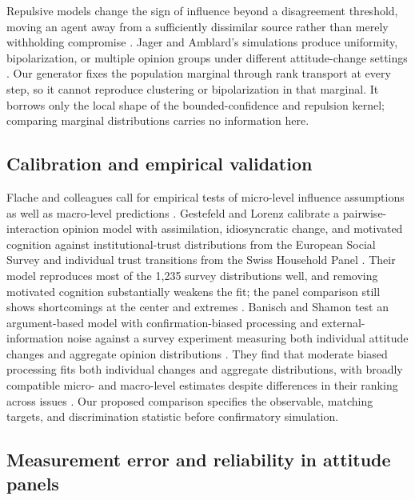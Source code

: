 Repulsive models change the sign of influence beyond a disagreement threshold, moving an agent away from a sufficiently dissimilar source rather than merely withholding compromise \cite{jager2005,flache2017}.
Jager and Amblard's simulations produce uniformity, bipolarization, or multiple opinion groups under different attitude-change settings \cite{jager2005}.
Our generator fixes the population marginal through rank transport at every step, so it cannot reproduce clustering or bipolarization in that marginal. It borrows only the local shape of the bounded-confidence and repulsion kernel; comparing marginal distributions carries no information here.

\subsection{Calibration and empirical validation}

Flache and colleagues call for empirical tests of micro-level influence assumptions as well as macro-level predictions \cite{flache2017}.
Gestefeld and Lorenz calibrate a pairwise-interaction opinion model with assimilation, idiosyncratic change, and motivated cognition against institutional-trust distributions from the European Social Survey and individual trust transitions from the Swiss Household Panel \cite{gestefeld2023}.
Their model reproduces most of the 1,235 survey distributions well, and removing motivated cognition substantially weakens the fit; the panel comparison still shows shortcomings at the center and extremes \cite{gestefeld2023}.
Banisch and Shamon test an argument-based model with confirmation-biased processing and external-information noise against a survey experiment measuring both individual attitude changes and aggregate opinion distributions \cite{banisch2024}.
They find that moderate biased processing fits both individual changes and aggregate distributions, with broadly compatible micro- and macro-level estimates despite differences in their ranking across issues \cite{banisch2024}.
Our proposed comparison specifies the observable, matching targets, and discrimination statistic before confirmatory simulation.

\subsection{Measurement error and reliability in attitude panels}

